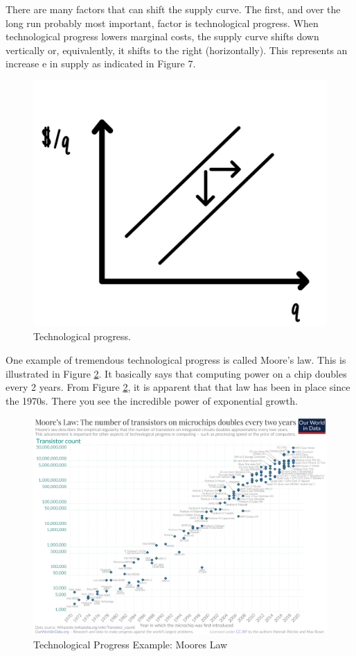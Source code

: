 \documentclass[
]{book}
\begin{document}
There are many factors that can shift the supply curve. The first, and over the long run probably most important, factor is technological progress. When technological progress lowers marginal costs, the supply curve shifts down vertically or, equivalently, it shifts to the right (horizontally). This represents an increase e in supply as indicated in Figure 7.

\begin{figure}

{\centering \includegraphics[width=0.75\linewidth]{img/supply/fig7} 

}

\caption{Technological progress.}\label{fig:supply07}
\end{figure}

One example of tremendous technological progress is called Moore's law. This is illustrated in Figure \ref{fig:supply08}. It basically says that computing power on a chip doubles every 2 years. From Figure \ref{fig:supply08}, it is apparent that that law has been in place since the 1970s. There you see the incredible power of exponential growth.

\begin{figure}

{\centering \includegraphics[width=0.75\linewidth]{img/supply/fig8} 

}

\caption{Technological Progress Example: Moores Law}\label{fig:supply08}
\end{figure}
\end{document}
